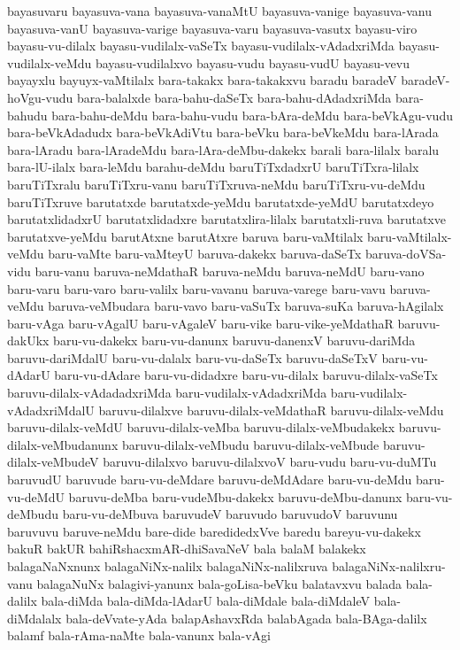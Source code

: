 {bayasuvaru
bayasuva-vana
bayasuva-vanaMtU
bayasuva-vanige
bayasuva-vanu
bayasuva-vanU
bayasuva-varige
bayasuva-varu
bayasuva-vasutx
bayasu-viro
bayasu-vu-dilalx
bayasu-vudilalx-vaSeTx
bayasu-vudilalx-vAdadxriMda
bayasu-vudilalx-veMdu
bayasu-vudilalxvo
bayasu-vudu
bayasu-vudU
bayasu-vevu
bayayxlu
bayuyx-vaMtilalx
bara-takakx
bara-takakxvu
baradu
baradeV
baradeV-hoVgu-vudu
bara-balalxde
bara-bahu-daSeTx
bara-bahu-dAdadxriMda
bara-bahudu
bara-bahu-deMdu
bara-bahu-vudu
bara-bAra-deMdu
bara-beVkAgu-vudu
bara-beVkAdadudx
bara-beVkAdiVtu
bara-beVku
bara-beVkeMdu
bara-lArada
bara-lAradu
bara-lAradeMdu
bara-lAra-deMbu-dakekx
barali
bara-lilalx
baralu
bara-lU-ilalx
bara-leMdu
barahu-deMdu
baruTiTxdadxrU
baruTiTxra-lilalx
baruTiTxralu
baruTiTxru-vanu
baruTiTxruva-neMdu
baruTiTxru-vu-deMdu
baruTiTxruve
barutatxde
barutatxde-yeMdu
barutatxde-yeMdU
barutatxdeyo
barutatxlidadxrU
barutatxlidadxre
barutatxlira-lilalx
barutatxli-ruva
barutatxve
barutatxve-yeMdu
barutAtxne
barutAtxre
baruva
baru-vaMtilalx
baru-vaMtilalx-veMdu
baru-vaMte
baru-vaMteyU
baruva-dakekx
baruva-daSeTx
baruva-doVSa-vidu
baru-vanu
baruva-neMdathaR
baruva-neMdu
baruva-neMdU
baru-vano
baru-varu
baru-varo
baru-valilx
baru-vavanu
baruva-varege
baru-vavu
baruva-veMdu
baruva-veMbudara
baru-vavo
baru-vaSuTx
baruva-suKa
baruva-hAgilalx
baru-vAga
baru-vAgalU
baru-vAgaleV
baru-vike
baru-vike-yeMdathaR
baruvu-dakUkx
baru-vu-dakekx
baru-vu-danunx
baruvu-danenxV
baruvu-dariMda
baruvu-dariMdalU
baru-vu-dalalx
baru-vu-daSeTx
baruvu-daSeTxV
baru-vu-dAdarU
baru-vu-dAdare
baru-vu-didadxre
baru-vu-dilalx
baruvu-dilalx-vaSeTx
baruvu-dilalx-vAdadadxriMda
baru-vudilalx-vAdadxriMda
baru-vudilalx-vAdadxriMdalU
baruvu-dilalxve
baruvu-dilalx-veMdathaR
baruvu-dilalx-veMdu
baruvu-dilalx-veMdU
baruvu-dilalx-veMba
baruvu-dilalx-veMbudakekx
baruvu-dilalx-veMbudanunx
baruvu-dilalx-veMbudu
baruvu-dilalx-veMbude
baruvu-dilalx-veMbudeV
baruvu-dilalxvo
baruvu-dilalxvoV
baru-vudu
baru-vu-duMTu
baruvudU
baruvude
baru-vu-deMdare
baruvu-deMdAdare
baru-vu-deMdu
baru-vu-deMdU
baruvu-deMba
baru-vudeMbu-dakekx
baruvu-deMbu-danunx
baru-vu-deMbudu
baru-vu-deMbuva
baruvudeV
baruvudo
baruvudoV
baruvunu
baruvuvu
baruve-neMdu
bare-dide
baredidedxVve
baredu
bareyu-vu-dakekx
bakuR
bakUR
bahiRshacxmAR-dhiSavaNeV
bala
balaM
balakekx
balagaNaNxnunx
balagaNiNx-nalilx
balagaNiNx-nalilxruva
balagaNiNx-nalilxru-vanu
balagaNuNx
balagivi-yanunx
bala-goLisa-beVku
balatavxvu
balada
bala-dalilx
bala-diMda
bala-diMda-lAdarU
bala-diMdale
bala-diMdaleV
bala-diMdalalx
bala-deVvate-yAda
balapAshavxRda
balabAgada
bala-BAga-dalilx
balamf
bala-rAma-naMte
bala-vanunx
bala-vAgi
}
